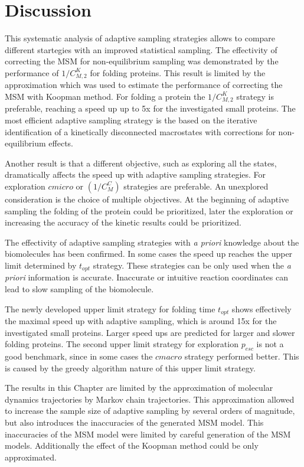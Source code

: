 \section{\label{sec:conclusion}Discussion}


This systematic analysis of adaptive sampling strategies allows to compare different startegies with an improved statistical sampling.
The effectivity of correcting the MSM for non-equilibrium sampling was demonstrated by the performance of $1/C_{M,2}^K$ for folding proteins. This result is limited by the approximation which was used to estimate the performance of correcting the MSM with Koopman method. For folding a protein the $1/C_{M,2}^K$ strategy is preferable, reaching a speed up up to 5x for the investigated small proteins. The most efficient adaptive sampling strategy is the based on the iterative identification of a kinetically disconnected macrostates with corrections for non-equilibrium effects.

Another result is that a different objective, such as exploring all the states, dramatically affects the speed up with adaptive sampling strategies. For exploration $cmicro$ or  $(1/C_M^C)$ strategies are preferable. 
An unexplored consideration is the choice of multiple objectives. At the beginning of adaptive sampling the folding of the protein could be prioritized, later the exploration or increasing the accuracy of the kinetic results could be prioritized.

The effectivity of adaptive sampling strategies with \emph{a priori} knowledge about the biomolecules has been confirmed. In some cases the speed up reaches the upper limit determined by $t_{opt}$ strategy. These strategies can be only used when the \emph{a priori} information is accurate. Inaccurate or intuitive reaction coordinates can lead to slow sampling of the biomolecule.

The newly developed upper limit strategy for folding time $t_{opt}$ shows effectively the maximal speed up with adaptive sampling, which is around 15x for the investigated small proteins. Larger speed ups are predicted for larger and slower folding proteins. The second upper limit strategy for exploration $p_{esc}$ is not a good benchmark, since in some cases the $cmacro$ strategy performed better. This is caused by the greedy algorithm nature of this upper limit strategy.

The results in this Chapter are limited by the approximation of molecular dynamics trajectories by Markov chain trajectories. This approximation allowed to increase the sample size of adaptive sampling by several orders of magnitude, but also introduces the inaccuracies of the generated MSM model. This inaccuracies of the MSM model were limited by careful generation of the MSM models. Additionally the effect of the Koopman method could be only approximated.

